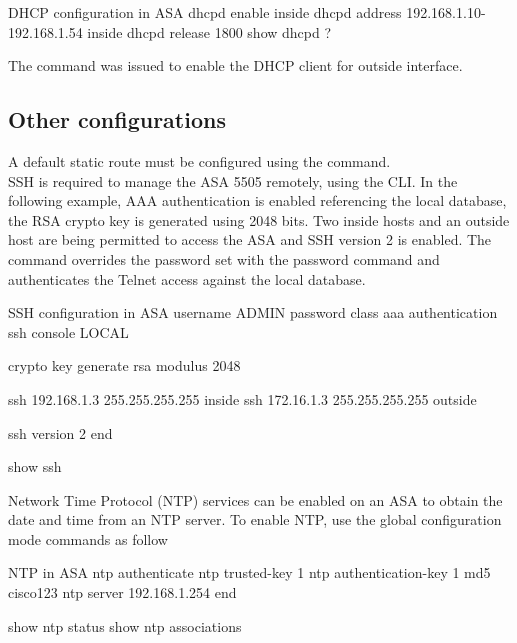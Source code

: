 \begin{sexylisting}{DHCP configuration in ASA}
dhcpd enable inside
dhcpd address 192.168.1.10-192.168.1.54 inside
dhcpd release 1800
show dhcpd ?
\end{sexylisting}

The  command was issued to enable the DHCP client for outside interface.

\subsection{Other configurations}

A default static route must be configured using the  command.\\

SSH is required to manage the ASA 5505 remotely, using the CLI. In the following example, AAA authentication is enabled referencing the local database, the RSA crypto key is generated using 2048 bits. Two inside hosts and an outside host are being permitted to access the ASA and SSH version 2 is enabled. The  command overrides the password set with the password command and authenticates the Telnet access against the local database.

\begin{sexylisting}{SSH configuration in ASA}
username ADMIN password class
aaa authentication ssh console LOCAL

crypto key generate rsa modulus 2048

ssh 192.168.1.3 255.255.255.255 inside
ssh 172.16.1.3 255.255.255.255 outside

ssh version 2
end

show ssh
\end{sexylisting}

Network Time Protocol (NTP) services can be enabled on an ASA to obtain the date and time from an NTP server. To enable NTP, use the global configuration mode commands as follow

\begin{sexylisting}{NTP in ASA}
ntp authenticate
ntp trusted-key 1
ntp authentication-key 1 md5 cisco123
ntp server 192.168.1.254
end

show ntp status
show ntp associations 
\end{sexylisting}

